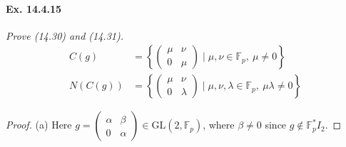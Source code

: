 \documentclass[11pt,a4paper]{article}
\newcommand{\F}{\mathbb{F}}
\begin{document}
{\paragraph{Ex. 14.4.15}{\it Prove (14.30) and (14.31).
\begin{align*}
C(g) &= \left\{\begin{pmatrix} \mu & \nu\\ 0 & \mu \end{pmatrix} \mid \mu,\nu \in \F_p, \ \mu \ne 0\right\}\\
N(C(g)) &=  \left\{\begin{pmatrix} \mu & \nu\\ 0 & \lambda \end{pmatrix} \mid \mu,\nu,\lambda \in \F_p,\  \mu \lambda \ne 0\right\}
\end{align*}
}

\begin{proof}
\item[(a)]
 Here $g = \begin{pmatrix} \alpha & \beta\\ 0 & \alpha \end{pmatrix} \in \mathrm{GL}(2,\F_p)$, where $\beta \ne 0$ since $g \not \in \F_p^* I_2$.


\end{proof}}
\end{document}
